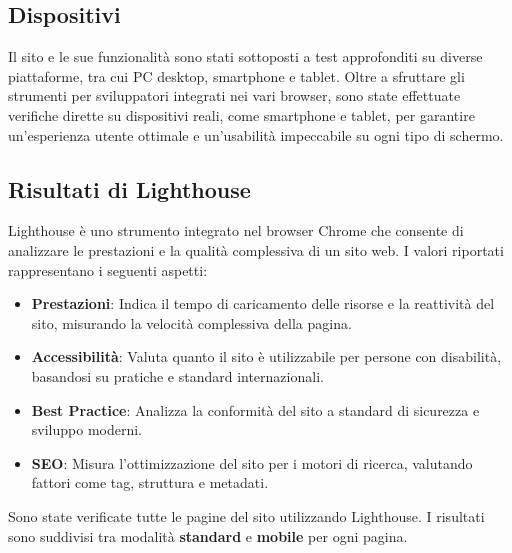 \subsection{Dispositivi}
Il sito e le sue funzionalit\`a sono stati sottoposti a test approfonditi su diverse piattaforme, tra cui PC desktop, smartphone e tablet. Oltre a sfruttare gli strumenti per sviluppatori integrati nei vari browser, sono state effettuate verifiche dirette su dispositivi reali, come smartphone e tablet, per garantire un'esperienza utente ottimale e un'usabilità impeccabile su ogni tipo di schermo.
\subsection{Risultati di Lighthouse}
Lighthouse è uno strumento integrato nel browser Chrome che consente di analizzare le prestazioni e la qualità complessiva di un sito web. I valori riportati rappresentano i seguenti aspetti:  
\begin{itemize}
    \item \textbf{Prestazioni}: Indica il tempo di caricamento delle risorse e la reattività del sito, misurando la velocità complessiva della pagina.
    \item \textbf{Accessibilità}: Valuta quanto il sito è utilizzabile per persone con disabilità, basandosi su pratiche e standard internazionali.
    \item \textbf{Best Practice}: Analizza la conformità del sito a standard di sicurezza e sviluppo moderni.
    \item \textbf{SEO}: Misura l'ottimizzazione del sito per i motori di ricerca, valutando fattori come tag, struttura e metadati.
\end{itemize}

Sono state verificate tutte le pagine del sito utilizzando Lighthouse. I risultati sono suddivisi tra modalità \textbf{standard} e \textbf{mobile} per ogni pagina.

